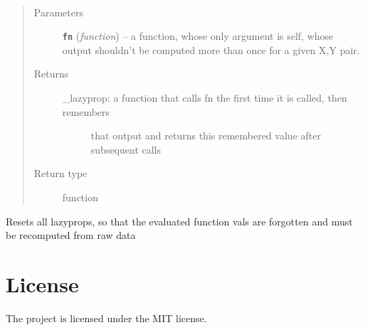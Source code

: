 \documentclass[letterpaper,10pt,english]{sphinxmanual}
\begin{document}
\begin{fulllineitems}
\label{index:smbo.lazyprop.lazyprop}~\begin{quote}\begin{description}
\item[{Parameters}] \leavevmode
\textbf{\texttt{fn}} (\emph{function}) -- a function, whose only argument is self, whose output shouldn't
be computed more than once for a given X,Y pair.

\item[{Returns}] \leavevmode
\begin{description}
\item[{\_lazyprop: a function that calls fn the first time it is called, then remembers}] \leavevmode
that output and returns this remembered value after subsequent calls

\end{description}


\item[{Return type}] \leavevmode
function

\end{description}\end{quote}

\end{fulllineitems}


\begin{fulllineitems}
\label{index:smbo.lazyprop.reset_lps}
Resets all lazyprops, so that the evaluated function vals are forgotten and must be
recomputed from raw data

\end{fulllineitems}



\section{License}
\label{index:license}
The project is licensed under the MIT license.
\end{document}
